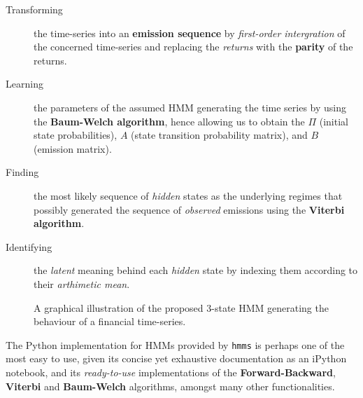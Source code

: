 \begin{description}
\item[Transforming]{ the time-series into an \textbf{emission sequence} by \textit{first-order intergration} of the concerned time-series and replacing the \textit{returns} with the \textbf{parity} of the returns.}
\item[Learning]{ the parameters of the assumed HMM generating the time series by using the \textbf{Baum-Welch algorithm}, hence allowing us to obtain the $\Pi$ (initial state probabilities), $A$ (state transition probability matrix), and $B$ (emission matrix).}
\item[Finding]{ the most likely sequence of \textit{hidden} states as the underlying regimes that possibly generated the sequence of \textit{observed} emissions using the \textbf{Viterbi algorithm}.}
\item[Identifying]{ the \textit{latent} meaning behind each \textit{hidden} state by indexing them according to their \textit{arthimetic mean}.}

\end{description}
\begin{figure}[htbp]
\begin{center}
\end{center}
\caption{A graphical illustration of the proposed 3-state HMM generating the behaviour of a financial time-series.}
\end{figure}

The Python implementation for HMMs provided by \texttt{hmms}\cite{hmmsgit} is perhaps one of the most easy to use, given its concise yet exhaustive documentation as an iPython notebook\cite{hmmsnotebook}, and its \textit{ready-to-use} implementations of the \textbf{Forward-Backward}, \textbf{Viterbi} and \textbf{Baum-Welch} algorithms, amongst many other functionalities. 

